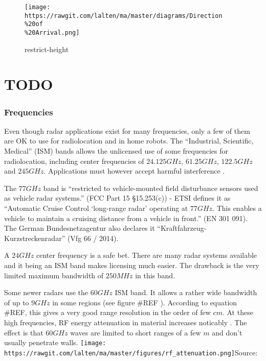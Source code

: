 \begin{figure}
\centering
\texttt{[image: https://rawgit.com/lalten/ma/master/diagrams/Direction\\\%20of\\\%20Arrival.png]}
\caption{restrict-height}
\end{figure}

\section{TODO}\label{todo}

\cite{Hacker2010} \cite{Cho2017}

\subsubsection{Frequencies}\label{frequencies}

Even though radar applications exist for many frequencies, only a few of
them are OK to use for radiolocation and in home robots. The
``Industrial, Scientific, Medical'' (ISM) bands allows the unlicensed
use of some frequencies for radiolocation, including center frequencies
of \(24.125 GHz\), \(61.25 GHz\), \(122.5 GHz\) and \(245 GHz\).
Applications must however accept harmful interference \cite{FCC2017}.

The \(77 GHz\) band is ``restricted to vehicle-mounted field disturbance
sensors used as vehicle radar systems.'' (FCC Part 15 §15.253(c)) - ETSI
defines it as ``Automatic Cruise Control `long-range radar' operating at
\(77 GHz\). This enables a vehicle to maintain a cruising distance from
a vehicle in front.'' (EN 301 091). The German Bundesnetzagentur also
declares it ``Kraftfahrzeug-Kurzstreckenradar'' (Vfg 66 / 2014).

A \(24 GHz\) center frequency is a safe bet. There are many radar
systems available and it being an ISM band makes licensing much easier.
The drawback is the very limited maximum bandwidth of \(250MHz\) in this
band.

Some newer radars use the \(60 GHz\) ISM band. It allows a rather wide
bandwidth of up to \(9GHz\) in some regions (see figure \#REF ).
According to equation \#REF, this gives a very good range resolution in
the order of few \(cm\). At these high frequencies, RF energy
attenuation in material increases noticably \cite{FerrisJr.1998}. The
effect is that \(60GHz\) waves are limited to short ranges of a few
\(m\) and don't usually penetrate walls.
\texttt{[image: https://rawgit.com/lalten/ma/master/figures/rf\_attenuation.png]}Source:
\cite{FerrisJr.1998}

